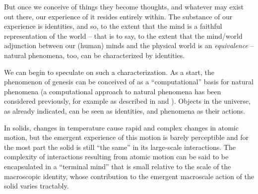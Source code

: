 \documentclass[pra,twocolumn,groupedaddress,10pt]{revtex4}
\theoremstyle{definition}
\begin{document}
But once we conceive of things they become thoughts, and whatever may exist out there, our experience of it resides entirely within. The substance of our experience is identities, and so, to the extent that the mind is a faithful representation of the world -- that is to say, to the extent that the mind/world adjunction between our (human) minds and the physical world is an \textit{equivalence} -- natural phenomena, too, can be characterized by identities.

We can begin to speculate on such a characterization. As a start, the phenomenon of genesis can be conceived of as a ``computational'' basis for natural phenomena (a computational approach to natural phenomena has been considered previously, for example as described in \cite{greatideas} and \cite{wolfram}). Objects in the universe, as already indicated, can be seen as identities, and phenomena as their actions.

In solids, changes in temperature cause rapid and complex changes in atomic motion, but the emergent experience of this motion is barely perceptible and for the most part the solid is still ``the same'' in its large-scale interactions. The complexity of interactions resulting from atomic motion can be said to be encapsulated in a ``terminal mind'' that is small relative to the scale of the macroscopic identity, whose contribution to the emergent macroscale action of the solid varies tractably.
\end{document}
